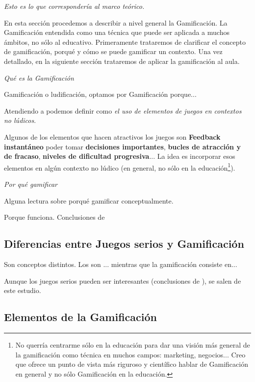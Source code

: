 \documentclass[a4paper, 12pt]{book}
\newcommand{\coment}[1]{\textit{#1}}
\begin{document}
\coment{Esto es lo que correspondería al marco teórico.}

En esta sección procedemos a describir a nivel general la Gamificación. 
%
La Gamificación entendida como una técnica que puede ser aplicada a muchos ámbitos, no sólo al educativo. 
%
Primeramente trataremos de clarificar el concepto de gamificación, porqué y cómo se puede gamificar un contexto.
%
Una vez detallado, en la siguiente sección trataremos de aplicar la gamificación al aula.



\coment{Qué es la Gamificación}

Gamificación o ludificación, optamos por Gamificación porque...

Atendiendo a \cite{GamificationDef} podemos definir  como \textit{el uso de elementos de juegos en contextos no lúdicos}. 

Algunos de los elementos que hacen atractivos los juegos son
\textbf{Feedback instantáneo}
poder tomar \textbf{decisiones importantes},
\textbf{bucles de atracción y de fracaso},
\textbf{niveles de dificultad progresiva}... La idea es incorporar esos elementos en algún contexto no lúdico (en general, no sólo en la educación\footnote{No querría centrarme sólo en la educación para dar una visión más general de la gamificación como técnica en muchos campos: marketing, negocios... Creo que ofrece un punto de vista más riguroso y científico hablar de Gamificación en general y no sólo Gamificación en la educación.}).


\coment{Por qué gamificar}

Alguna lectura sobre porqué gamificar conceptualmente.

Porque funciona. Conclusiones de \cite{EmpiricalGamification}


\subsection{Diferencias entre Juegos serios y Gamificación}

Son conceptos distintos. Los  son \cite{GamificationDef}... mientras que la gamificación consiste en...

Aunque los juegos serios pueden ser interesantes (conclusiones de \cite{MetaSerious}), se salen de este estudio.


\subsection{Elementos de la Gamificación}
\end{document}
